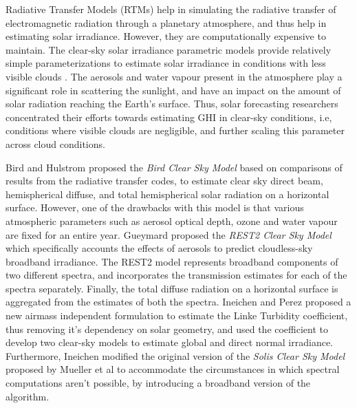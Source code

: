 \par Radiative Transfer Models (RTMs) help in simulating the radiative transfer of electromagnetic radiation through a planetary atmosphere, and thus help in estimating solar irradiance. However, they are computationally expensive to maintain. The clear-sky solar irradiance parametric models provide relatively simple parameterizations to estimate solar irradiance in conditions with less visible clouds \cite{litrev_pvlib8}. The aerosols and water vapour present in the atmosphere play a significant role in scattering the sunlight, and have an impact on the amount of solar radiation reaching the Earth's surface. Thus, solar forecasting researchers concentrated their efforts towards estimating GHI in clear-sky conditions, i.e, conditions where visible clouds are negligible, and further scaling this parameter across cloud conditions. 

\par Bird and Hulstrom \cite{litrev_pvlib9} proposed the \textit{Bird Clear Sky Model} based on comparisons of results from the radiative transfer codes, to estimate clear sky direct beam, hemispherical diffuse, and total hemispherical solar radiation on a horizontal surface. However, one of the drawbacks with this model is that various atmospheric parameters such as aerosol optical depth, ozone and water vapour are fixed for an entire year. Gueymard \cite{litrev_pvlib10} proposed the \textit{REST2 Clear Sky Model} which specifically accounts the effects of aerosols to predict cloudless-sky broadband irradiance. The REST2 model represents broadband components of two different spectra, and incorporates the transmission estimates for each of the spectra separately. Finally, the total diffuse radiation on a horizontal surface is aggregated from the estimates of both the spectra. Ineichen and Perez \cite{litrev_pvlib14} proposed a new airmass independent formulation to estimate the Linke Turbidity coefficient, thus removing it's dependency on solar geometry, and used the coefficient to develop two clear-sky models to estimate global and direct normal irradiance. Furthermore, Ineichen \cite{litrev_pvlib11} modified the original version of the \textit{Solis Clear Sky Model} proposed by Mueller et al \cite{litrev_pvlib12} to accommodate the circumstances in which spectral computations aren't possible, by introducing a broadband version of the algorithm. 

